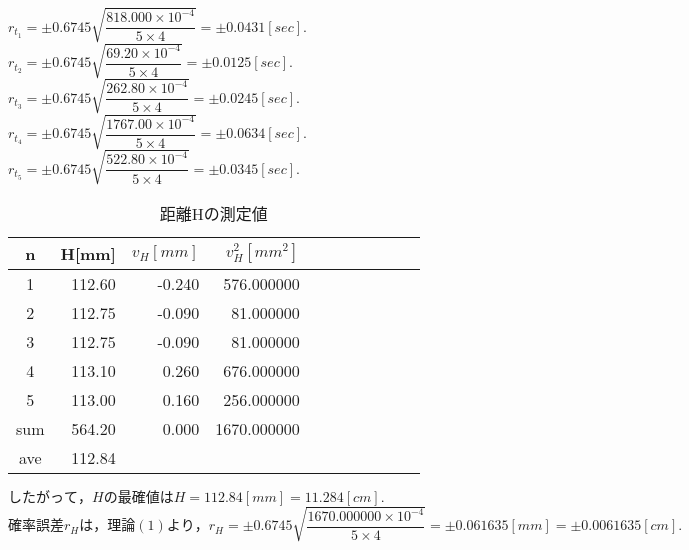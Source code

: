 \documentclass[a4paper,1pt]{jsarticle}
\begin{document}
$r_{t_1}=\pm0.6745\sqrt{\dfrac{818.000\times10^{-4}}{5\times4}}=\pm0.0431[sec].$\\

$r_{t_2}=\pm0.6745\sqrt{\dfrac{69.20\times10^{-4}}{5\times4}}=\pm0.0125[sec].$\\

$r_{t_3}=\pm0.6745\sqrt{\dfrac{262.80\times10^{-4}}{5\times4}}=\pm0.0245[sec].$\\

$r_{t_4}=\pm0.6745\sqrt{\dfrac{1767.00\times10^{-4}}{5\times4}}=\pm0.0634[sec].$\\

$r_{t_5}=\pm0.6745\sqrt{\dfrac{522.80\times10^{-4}}{5\times4}}=\pm0.0345[sec].$\\

\begin{table}[H]
  \caption{距離Hの測定値}
  \label{table:SpeedOfLight}
  \centering
  \begin{tabular}{|c||r|r|r|r|r|r|r|r|r|r|}
    \hline
    n & H[mm] & $v_H[mm]$ & $v_H^2[mm^2]$ \\

    \hline\hline
    1 & 112.60 & -0.240 & 576.000000 \\
    2 & 112.75 & -0.090 & 81.000000 \\
    3 & 112.75 & -0.090 & 81.000000 \\
    4 & 113.10 & 0.260 & 676.000000 \\
    5 & 113.00 & 0.160 & 256.000000 \\

    \hline\hline
    sum & 564.20 & 0.000 & 1670.000000 \\
    \hline
    ave & 112.84 & &  \\

    \hline
  \end{tabular}


\end{table}

$したがって，Hの最確値はH=112.84[mm]=11.284[cm].$\\

$確率誤差r_Hは，理論(1)より，r_H=\pm0.6745\sqrt{\dfrac{1670.000000\times10^{-4}}{5\times4}}=\pm0.061635[mm]=\pm0.0061635[cm].$
\end{document}
